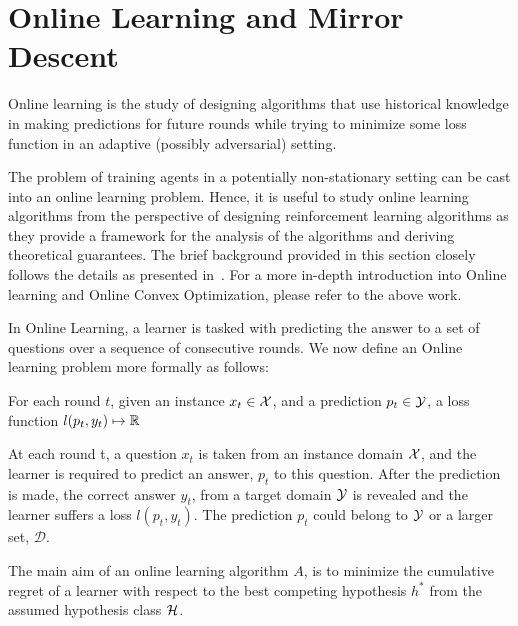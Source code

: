 \section{Online Learning and Mirror Descent}

Online learning is the study of designing
algorithms that use historical knowledge in making predictions for future rounds while trying to
minimize some loss function in an adaptive (possibly adversarial) setting.

The problem of training agents in a potentially non-stationary setting can be cast into an online
learning problem.
Hence, it is useful to study online learning algorithms from the perspective of designing
reinforcement learning algorithms as they provide a framework for the analysis of the algorithms
and deriving theoretical guarantees.
The brief background provided in this section closely follows the details as presented
in~\cite{shalev-shwartzOnline2012}.
For a more in-depth introduction into Online learning and Online Convex Optimization, please refer
to the above work.

In Online Learning, a learner is tasked with predicting the answer to a set of questions over a
sequence of consecutive rounds.
We now define an Online learning problem more formally as follows:

\begin{definition}
	\label{def:olearning} For each round $t$, given an instance $x_t \in \mathcal{X}$, and
	a prediction $p_t \in \mathcal{Y}$, a loss function $l(p_t, y_t) \mapsto \mathbb{R}$
\end{definition}

At each round t, a question $x_t$ is taken from an instance domain $\mathcal{X}$, and
the learner is required to predict an answer, $p_t$ to this question.
After the prediction is made, the correct answer $y_t$, from a target domain $\mathcal{Y}$ is revealed
and the learner suffers a loss $l(p_t, y_t)$.
The prediction $p_t$ could belong to $\mathcal{Y}$ or a larger set, $\mathcal{D}$.


The main aim of an online learning algorithm $A$, is to minimize the cumulative regret of a learner
with respect to the best competing hypothesis $h^*$ from the assumed hypothesis class $\mathcal{H}$.

